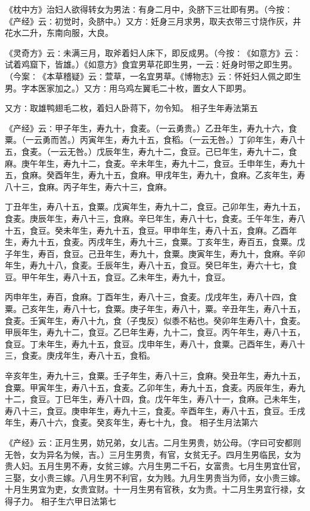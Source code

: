 \documentclass[a4paper,12pt,UTF8,twoside]{ctexbook}
\begin{document}
《枕中方》治妇人欲得转女为男法∶有身二月中，灸脐下三壮即有男。（今按∶《产经》云∶初觉时，灸脐中。）又方∶妊身三月求男，取夫衣带三寸烧作灰，井花水二升，东南向服，大良。

《灵奇方》云∶未满三月，取斧着妇人床下，即反成男。（今按∶《如意方》云∶试着鸡窟下，皆雄。）《如意方》食宜男草花即生男，一云∶妊身时带之即生男。（今案∶《本草稽疑》云∶萱草，一名宜男草。《博物志》云∶怀妊妇人佩之即生男。字本医家加之。）又方∶用乌鸡左翼毛二十枚，置女人下即男。

又方∶取雄鸭翅毛二枚，着妇人卧蒋下，勿令知。
相子生年寿法第五

《产经》云∶甲子年生，寿九十，食麦。（一云勇贵。）乙丑年生，寿九十六，食粟。（一云勇而苦。）丙寅年生，寿九十五，食稻。（一云无咎。）丁卯年生，寿八十五，食麦。（一云无咎。）戊辰年生，寿九十二，食豆。己巳年生，寿九十二，食麻。庚午年生，寿九十二，食麦。辛未年生，寿九十二，食豆。壬申年生，寿九十五，食麻。癸酉年生，寿九十五，食麻。甲戌年生，寿九十，食麻。乙亥年生，寿八十三，食麻。丙子年生，寿六十三，食麻。

丁丑年生，寿八十五，食粟。戊寅年生，寿九十二，食豆。己卯年生，寿九十五，食麦。庚辰年生，寿八十三，食麻。辛巳年生，寿八十七，食麦。壬午年生，寿八十五，食豆。癸未年生，寿九十五，食豆。甲申年生，寿八十五，食麻。乙酉年生，寿九十五，食麦。丙戌年生，寿九十三，食粟。丁亥年生，寿百五，食粟。戊子年生，寿百，食豆。己丑年生，寿九十，食粟。庚寅年生，寿九十，食麻。辛卯年生，寿九十八，食麦。壬辰年生，寿八十五，食豆。癸巳年生，寿六十七，食豆。甲午年生，寿八十五，食豆。乙未年生，寿九十，食豆。

丙申年生，寿百，食麻。丁酉年生，寿八十三，食麦。戊戌年生，寿八十四，食粟。己亥年生，寿八十七，食粟。庚子年生，寿八十，粟。辛丑年生，寿八十五，食麦。壬寅年生，寿八十九，食（子曳反）似黍不粘也。癸卯年生寿八十，食麦。甲辰年生，寿九十二，食豆。乙巳年生寿，九十二，食豆。丙午年生，寿八十五，食豆。丁未年生，寿九十五，食豆。戊申年生，寿八十，食粟。己酉年生，寿八十三，食麦。庚戌年生，寿八十五，食稻。

辛亥年生，寿九十三，食粟。壬子年生，寿八十三，食麻。癸丑年生，寿九十五，食粟。甲寅年生，寿八十五，食麦。乙卯年生，寿九十五，食麦。丙辰年生，寿九十二，食豆。丁巳年生，寿八十四，食。戊午年生，寿八十一，食麻。己未年生，寿八十三，食豆。庚申年生，寿九十三，食麦。辛酉年生，寿八十五，食豆。壬戌年生，寿八十六，食麦。癸亥年生，寿七十九，食。
相子生月法第六

《产经》云∶正月生男，妨兄弟，女儿吉。二月生男贵，妨公母。（字曰可安都则无咎，女为异名为候，吉。）三月生男贵，有官，女贫无子。四月生男临民，女为贵人妇。五月生男不寿，女贫三嫁。六月生男二千石，女富贵。七月生男宜仕官，三娶，女小贵三嫁。八月生男不利官，女为贱。九月生男贵当为师，女小贵三嫁。十月生男宜为吏，女贵宜财。十一月生男有官秩，女为贵。十二月生男宜行禄，女得子力。
相子生六甲日法第七
\end{document}

